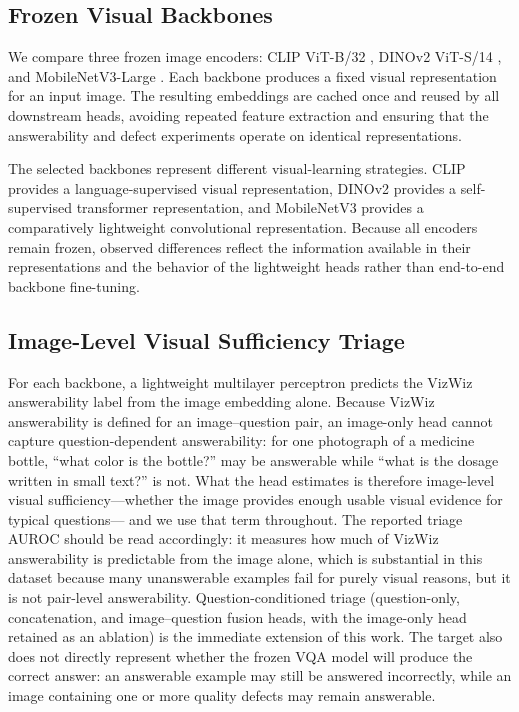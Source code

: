 \documentclass{ieeeaccess}
\newcommand{\clip}{CLIP}
\newcommand{\dinov}{DINOv2}
\newcommand{\mobilenet}{MobileNetV3}
\begin{document}
\subsection{Frozen Visual Backbones}

We compare three frozen image encoders: \clip{} ViT-B/32
\cite{radford2021clip}, \dinov{} ViT-S/14 \cite{oquab2023dinov2},
and \mobilenet{}-Large \cite{howard2019mobilenetv3}. Each backbone
produces a fixed visual representation for an input image. The
resulting embeddings are cached once and reused by all
downstream heads, avoiding repeated feature extraction and
ensuring that the answerability and defect experiments operate
on identical representations.

The selected backbones represent different visual-learning
strategies. \clip{} provides a language-supervised visual
representation, \dinov{} provides a self-supervised transformer
representation, and \mobilenet{} provides a comparatively
lightweight convolutional representation. Because all encoders
remain frozen, observed differences reflect the information
available in their representations and the behavior of the
lightweight heads rather than end-to-end backbone fine-tuning.

\subsection{Image-Level Visual Sufficiency Triage}
\label{sec:triage_method}

For each backbone, a lightweight multilayer perceptron predicts
the VizWiz answerability label from the image embedding alone.
Because VizWiz answerability is defined for an image--question
pair, an image-only head cannot capture question-dependent
answerability: for one photograph of a medicine bottle, ``what
color is the bottle?'' may be answerable while ``what is the
dosage written in small text?'' is not. What the head estimates
is therefore image-level visual sufficiency---whether the image
provides enough usable visual evidence for typical questions---%
and we use that term throughout. The reported triage AUROC
should be read accordingly: it measures how much of VizWiz
answerability is predictable from the image alone, which is
substantial in this dataset because many unanswerable examples
fail for purely visual reasons, but it is not pair-level
answerability. Question-conditioned triage (question-only,
concatenation, and image--question fusion heads, with the
image-only head retained as an ablation) is the immediate
extension of this work. The target also does not directly
represent whether the frozen VQA model will produce the correct
answer: an answerable example may still be answered incorrectly,
while an image containing one or more quality defects may remain
answerable.
\end{document}
